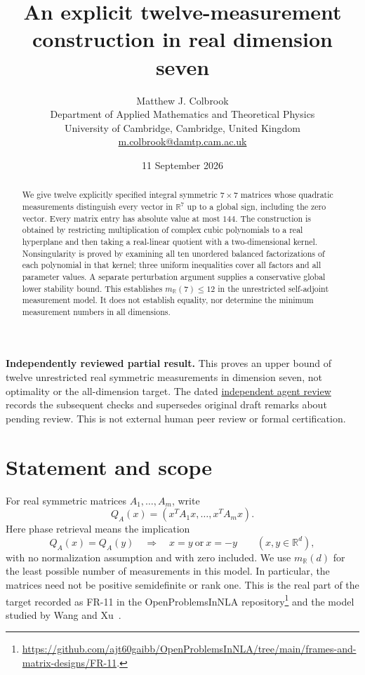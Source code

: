 \documentclass[11pt]{article}
\title{An explicit twelve-measurement construction in real dimension seven}
\author{Matthew J. Colbrook\\\small Department of Applied Mathematics and Theoretical Physics\\\small University of Cambridge, Cambridge, United Kingdom\\\small\href{mailto:m.colbrook@damtp.cam.ac.uk}{m.colbrook@damtp.cam.ac.uk}}\date{11 September 2026}
\theoremstyle{remark}\newtheorem{remark}[theorem]{Remark}
\newcommand{\R}{\mathbb R}\newcommand{\C}{\mathbb C}
\begin{document}
\maketitle

\noindent\textbf{Independently reviewed partial result.} This proves an upper bound of twelve unrestricted real symmetric measurements in dimension seven, not optimality or the all-dimension target.
The dated \href{https://github.com/MColbrook/OpenProblemsInNLA/blob/codex/colbrook-frames-submissions/references/colbrook-frames-2026-09-11/verification/reviews/FR-11-review.md}{independent agent review} records the subsequent checks and supersedes original draft remarks about pending review. This is not external human peer review or formal certification.
\par\medskip

\begin{abstract}
We give twelve explicitly specified integral symmetric $7\times7$ matrices whose quadratic measurements distinguish every vector in $\R^7$ up to a global sign, including the zero vector. Every matrix entry has absolute value at most $144$. The construction is obtained by restricting multiplication of complex cubic polynomials to a real hyperplane and then taking a real-linear quotient with a two-dimensional kernel. Nonsingularity is proved by examining all ten unordered balanced factorizations of each polynomial in that kernel; three uniform inequalities cover all factors and all parameter values. A separate perturbation argument supplies a conservative global lower stability bound. This establishes $m_{\R}(7)\le12$ in the unrestricted self-adjoint measurement model. It does not establish equality, nor determine the minimum measurement numbers in all dimensions.
\end{abstract}

\section{Statement and scope}
For real symmetric matrices $A_1,\ldots,A_m$, write
\[
 Q_A(x)=(x^T A_1x,\ldots,x^T A_mx).
\]
Here phase retrieval means the implication
\[
 Q_A(x)=Q_A(y)\quad\Longrightarrow\quad x=y\ \text{or}\ x=-y
 \qquad (x,y\in\R^d),
\]
with no normalization assumption and with zero included. We use $m_{\R}(d)$ for the least possible number of measurements in this model. In particular, the matrices need not be positive semidefinite or rank one. This is the real part of the target recorded as FR-11 in the OpenProblemsInNLA repository\footnote{\url{https://github.com/ajt60gaibb/OpenProblemsInNLA/tree/main/frames-and-matrix-designs/FR-11}.} and the model studied by Wang and Xu~\cite{WX}.
\end{document}
